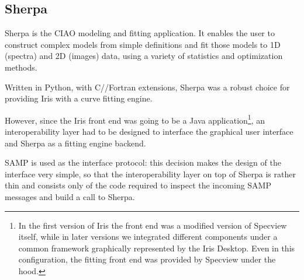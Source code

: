 \documentclass[5p]{elsarticle}
\begin{document}
\subsection{Sherpa}
\label{subsec:sherpa}
Sherpa is the CIAO modeling and fitting application. It enables the user to construct complex models from simple definitions and fit those models to 1D (spectra) and 2D (images) data, using a variety of statistics and optimization methods.

Written in Python, with C/\Cpp/Fortran extensions, Sherpa was a robust choice for providing Iris with a curve fitting engine. 

However, since the Iris front end was going to be a Java application\footnote{In the first version of Iris the front end was a modified version of Specview itself, while in later versions we integrated different components under a common framework graphically represented by the Iris Desktop. Even in this configuration, the fitting front end was provided by Specview under the hood.}, an interoperability layer had to be designed to interface the graphical user interface and Sherpa as a fitting engine backend.

SAMP is used as the interface protocol: this decision makes the design of the interface very simple, so that the interoperability layer on top of Sherpa is rather thin and consists only of the code required to inspect the incoming SAMP messages and build a call to Sherpa.
\end{document}
